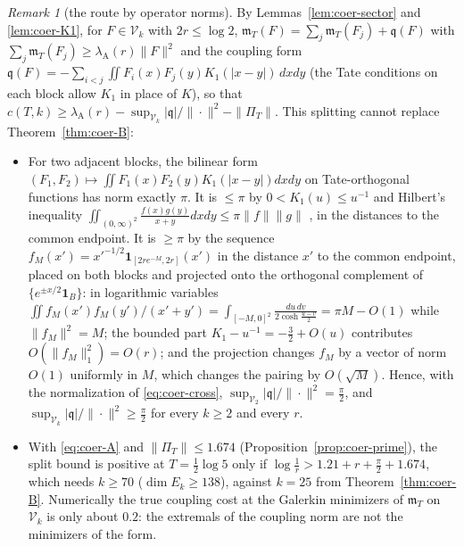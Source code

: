 \documentclass[11pt]{amsart}
\theoremstyle{definition}
\theoremstyle{remark}
\newtheorem{remark}[theorem]{Remark}
\newcommand{\PiT}{\Pi_T}
\newcommand{\mT}{\mathfrak m_T}
\begin{document}
\begin{remark}[the route by operator norms]\label{rem:coer-nogo}
By Lemmas~\ref{lem:coer-sector} and \ref{lem:coer-K1}, for $F\in\mathcal V_k$ with $2r\le\log2$,
$\mT(F)=\sum_j\mT(F_j)+\mathfrak q(F)$ with $\sum_j\mT(F_j)\ge\lambda_{\mathrm A}(r)\|F\|^2$ and the coupling form
$\mathfrak q(F)=-\sum_{i<j}\iint F_i(x)F_j(y)K_1(|x-y|)\,dxdy$ (the Tate conditions on each block allow $K_1$ in place of $K$),
so that $c(T,k)\ge\lambda_{\mathrm A}(r)-\sup_{\mathcal V_k}|\mathfrak q|/\|\cdot\|^2-\|\PiT\|$. This splitting cannot replace
Theorem~\ref{thm:coer-B}:
\begin{itemize}
\item[(a)] For two adjacent blocks, the bilinear form $(F_1,F_2)\mapsto\iint F_1(x)F_2(y)K_1(|x-y|)dxdy$ on Tate-orthogonal
functions has norm exactly $\pi$. It is $\le\pi$ by $0<K_1(u)\le u^{-1}$ and Hilbert's inequality
$\iint_{(0,\infty)^2}\frac{f(x)g(y)}{x+y}dxdy\le\pi\|f\|\|g\|$ \cite[Thm.~316]{HLP}, in the distances to the common endpoint. It is
$\ge\pi$ by the sequence $f_M(x')=x'^{-1/2}\mathbf 1_{[2re^{-M},2r]}(x')$ in the distance $x'$ to the common endpoint, placed on
both blocks and projected onto the orthogonal complement of $\{e^{\pm x/2}\mathbf 1_B\}$: in logarithmic variables
$\iint f_M(x')f_M(y')/(x'+y')=\int_{[-M,0]^2}\frac{du\,dv}{2\cosh\frac{u-v}2}=\pi M-O(1)$ while $\|f_M\|^2=M$; the bounded part
$K_1-u^{-1}=-\frac32+O(u)$ contributes $O(\|f_M\|_1^2)=O(r)$; and the projection changes $f_M$ by a vector of norm $O(1)$
uniformly in $M$, which changes the pairing by $O(\sqrt M)$. Hence, with the normalization of \eqref{eq:coer-cross},
$\sup_{\mathcal V_2}|\mathfrak q|/\|\cdot\|^2=\frac\pi2$, and $\sup_{\mathcal V_k}|\mathfrak q|/\|\cdot\|^2\ge\frac\pi2$ for every $k\ge2$ and every
$r$.
\item[(b)] With \eqref{eq:coer-A} and $\|\PiT\|\le1.674$ (Proposition~\ref{prop:coer-prime}), the split bound is positive at
$T=\frac12\log5$ only if $\log\frac1r>1.21+r+\frac\pi2+1.674$, which needs $k\ge70$ ($\dim E_k\ge138$), against $k=25$ from
Theorem~\ref{thm:coer-B}. Numerically the true coupling cost at the Galerkin minimizers of $\mT$ on $\mathcal V_k$ is only
about $0.2$: the extremals of the coupling norm are not the minimizers of the form.
\end{itemize}
\end{remark}


\end{document}

